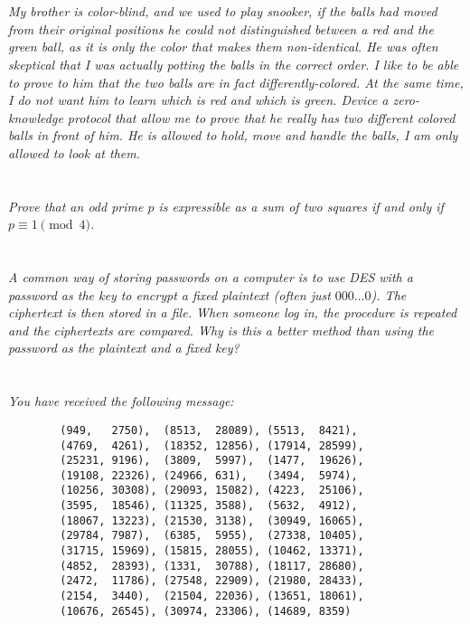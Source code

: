 \documentclass[12pt]{article}
\begin{document}
\newpage

\section{} \textit{My brother is color-blind, and we used to play snooker, if the balls had moved from their original positions he could not distinguished between a red and the green ball, as it is only the color that makes them non-identical. He was often skeptical that I was actually potting the balls in the correct order. I like to be able to prove to him that the two balls are in fact differently-colored. At the same time, I do not want him to learn which is red and which is green. Device a zero-knowledge protocol that allow me to prove that he really has two different colored balls in front of him. He is allowed to hold, move and handle the balls, I am only allowed to look at them. }

\newpage

\section{} \textit{Prove that an odd prime $p$ is expressible as a sum of two squares if and only if $p \equiv 1 \pmod{4}$.}

\newpage

\section{} \textit{A common way of storing passwords on a computer is to use DES with a password as the key to encrypt a fixed plaintext (often just $000\dots0$). The ciphertext is then stored in a file. When someone log in, the procedure is repeated and the ciphertexts are compared. Why is this a better method than using the password as the plaintext and a fixed key?}

\newpage

\section{} \textit{You have received the following message:}

    \begin{verbatim}
        (949,   2750),  (8513,  28089), (5513,  8421),
        (4769,  4261),  (18352, 12856), (17914, 28599),
        (25231, 9196),  (3809,  5997),  (1477,  19626),
        (19108, 22326), (24966, 631),   (3494,  5974),
        (10256, 30308), (29093, 15082), (4223,  25106),
        (3595,  18546), (11325, 3588),  (5632,  4912),
        (18067, 13223), (21530, 3138),  (30949, 16065),
        (29784, 7987),  (6385,  5955),  (27338, 10405),
        (31715, 15969), (15815, 28055), (10462, 13371),
        (4852,  28393), (1331,  30788), (18117, 28680),
        (2472,  11786), (27548, 22909), (21980, 28433),
        (2154,  3440),  (21504, 22036), (13651, 18061),
        (10676, 26545), (30974, 23306), (14689, 8359)
    \end{verbatim}
\end{document}
